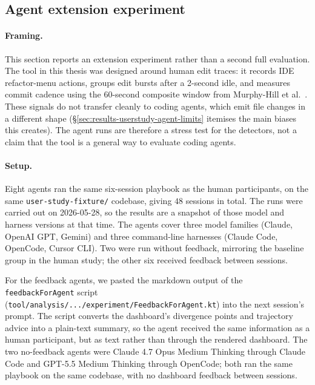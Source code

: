 \subsection{Agent extension experiment}
\label{sec:results-userstudy-agent}

\paragraph{Framing.}
This section reports an extension experiment rather than a second full evaluation. The tool in this thesis was designed around human edit traces: it records IDE refactor-menu actions, groups edit bursts after a 2-second idle, and measures commit cadence using the 60-second composite window from Murphy-Hill et al.~\cite{murphyhill2009howrefactor}. These signals do not transfer cleanly to coding agents, which emit file changes in a different shape (\S\ref{sec:results-userstudy-agent-limits} itemises the main biases this creates). The agent runs are therefore a stress test for the detectors, not a claim that the tool is a general way to evaluate coding agents.

\paragraph{Setup.}
Eight agents ran the same six-session playbook as the human participants, on the same \texttt{user-study-fixture/} codebase, giving $48$ sessions in total. The runs were carried out on 2026-05-28, so the results are a snapshot of those model and harness versions at that time. The agents cover three model families (Claude, OpenAI GPT, Gemini) and three command-line harnesses (Claude Code, OpenCode, Cursor CLI). Two were run without feedback, mirroring the baseline group in the human study; the other six received feedback between sessions.

For the feedback agents, we pasted the markdown output of the \texttt{feedbackForAgent} script (\texttt{tool/analysis/.../experiment/FeedbackForAgent.kt}) into the next session's prompt. The script converts the dashboard's divergence points and trajectory advice into a plain-text summary, so the agent received the same information as a human participant, but as text rather than through the rendered dashboard. The two no-feedback agents were Claude 4.7 Opus Medium Thinking through Claude Code and GPT-5.5 Medium Thinking through OpenCode; both ran the same playbook on the same codebase, with no dashboard feedback between sessions.

